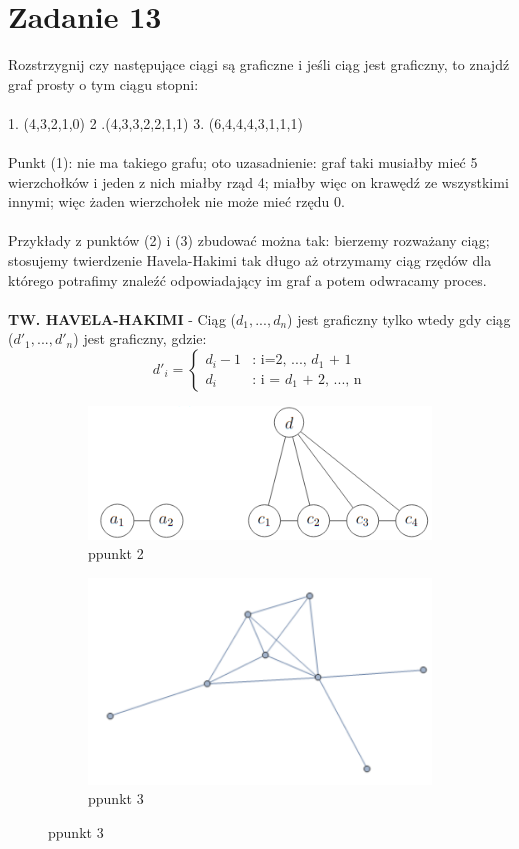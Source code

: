 \documentclass{article}
\begin{document}
\section{\centering Zadanie 13}
Rozstrzygnij czy następujące ciągi są graficzne i jeśli ciąg jest graficzny, to znajdź graf prosty o tym ciągu stopni: \\\\
1. (4,3,2,1,0) \hspace{1cm} 2 .(4,3,3,2,2,1,1) \hspace{1cm} 3. (6,4,4,4,3,1,1,1) \\\\
Punkt (1): nie ma takiego grafu; oto uzasadnienie: graf taki musiałby mieć 5 wierzchołków i jeden z nich miałby rząd 4; miałby więc on krawędź ze wszystkimi innymi; więc żaden wierzchołek nie może mieć rzędu 0.\\\\
Przykłady z punktów (2) i (3) zbudować można tak: bierzemy rozważany ciąg; stosujemy twierdzenie Havela-Hakimi tak długo aż otrzymamy ciąg rzędów dla którego potrafimy znaleźć odpowiadający im graf a potem odwracamy proces.\\\\
\textbf{TW. HAVELA-HAKIMI} - Ciąg ($d_{1},...,d_{n}$) jest graficzny tylko wtedy gdy ciąg ($d'_{1},...,d'_{n}$) jest graficzny, gdzie:
\begin{equation}
d'_{i}=\begin{cases}
d_{i} - 1  & \text{: i=2, ..., $d_{1}$ + 1}\\
d_{i}   & \text{: i = $d_{1}$ + 2, ..., n}
\end{cases}
\end{equation}
\begin{figure}[ht]
	\begin{subfigure}{.5\textwidth}
		\centering
		\includegraphics[width=.6\linewidth]{z13_p2.png}  
		\caption*{ppunkt 2}
		
	\end{subfigure}
	\begin{subfigure}{.5\textwidth}
		\centering
		\includegraphics[width=.6\linewidth]{z13_p3.png}  
		\caption*{ppunkt 3}
		
	\end{subfigure}
\end{figure}
\end{document}
